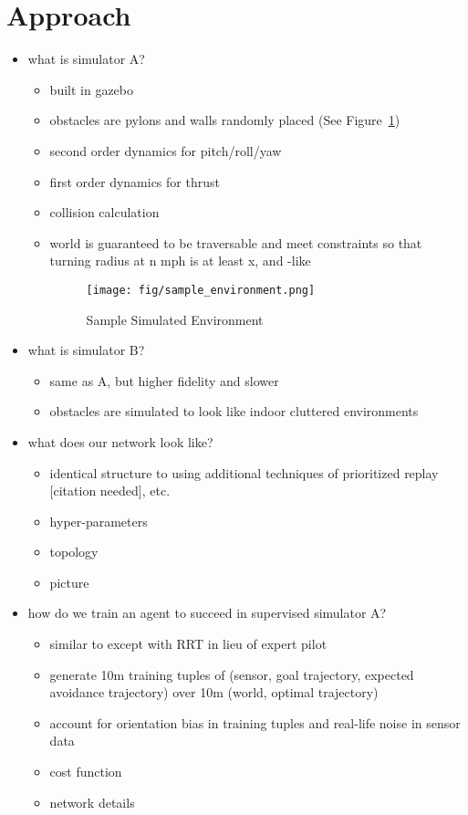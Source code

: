 \documentclass[paper=a4, fontsize=11pt]{scrartcl} %
\begin{document}
\section{Approach} 
\begin{itemize}
	\item what is simulator A?
	\begin{itemize}
		\item built in gazebo
		\item obstacles are pylons and walls randomly placed (See Figure~\ref{fig:sample_environment})
		\item second order dynamics for pitch/roll/yaw
		\item first order dynamics for thrust
		\item collision calculation
		\item world is guaranteed to be traversable and meet constraints so that turning radius at n mph is at least x, and \cite{Richter2014}-like 

		\begin{figure}
		  \centering
		  \texttt{[image: fig/sample\_environment.png]}
		  \caption{Sample Simulated Environment}
		  \label{fig:sample_environment}
		\end{figure}
	\end{itemize}

	\item what is simulator B?
	\begin{itemize}
		\item same as A, but higher fidelity and slower
		\item obstacles are simulated to look like indoor cluttered environments
	\end{itemize}

	\item what does our network look like?
	\begin{itemize}
		\item identical structure to \cite{Lillicrap2015} using additional techniques of prioritized replay [citation needed], etc.
		\item hyper-parameters
		\item topology
		\item picture
	\end{itemize}

	\item how do we train an agent to succeed in supervised simulator A?
	\begin{itemize}
		\item similar to \cite{Kim2015} except with RRT in lieu of expert pilot 
		\item generate 10m training tuples of (sensor, goal trajectory, expected avoidance trajectory) over 10m (world, optimal trajectory)
		\item account for orientation bias in training tuples and real-life noise in sensor data
		\item cost function
		\item network details
	\end{itemize}


\end{itemize}
\end{document}
